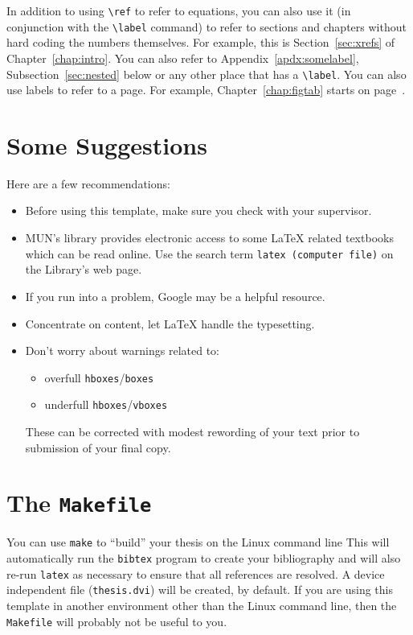 In addition to using \verb+\ref+ to refer to equations, you can also use
it (in conjunction with the \verb+\label+ command) to refer to sections
and chapters without hard coding the numbers themselves.  For example,
this is Section~\ref{sec:xrefs} of Chapter~\ref{chap:intro}.  You can
also refer to Appendix~\ref{apdx:somelabel}, Subsection~\ref{sec:nested}
below or any other place that has a \verb+\label+.  You can also use
labels to refer to a page.  For example, Chapter~\ref{chap:figtab}
starts on page~\pageref{chap:figtab}.

\section{Some Suggestions}

Here are a few recommendations:

\begin{itemize}
	\item Before using this template, make sure you check with
		your supervisor.
	\item MUN's library provides electronic access to some \LaTeX{}
		related textbooks which can be read online.  Use
		the search term \texttt{latex (computer file)} on the
		Library's web page.
	\item If you run into a problem, Google may be a helpful resource.
	\item Concentrate on content, let \LaTeX{} handle the typesetting.
	\item Don't worry about warnings related to:
	\begin{itemize}
		\item overfull \texttt{hboxes}/\texttt{boxes}
		\item underfull \texttt{hboxes}/\texttt{vboxes}
	\end{itemize}
	These can be corrected with modest rewording of your text prior
	to submission of your final copy.
\end{itemize}

\section{The \texttt{Makefile}}

You can use \texttt{make} to ``build'' your thesis on the Linux command
line This will
automatically run the \texttt{bibtex} program to create your bibliography
and will also re-run \texttt{latex} as necessary to ensure that all
references are resolved.  A device independent file (\texttt{thesis.dvi})
will be created, by default.  If you are using this template in another
environment other than the Linux command line, then the \texttt{Makefile}
will probably not be useful to you.

